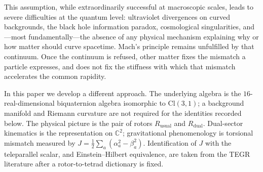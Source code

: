 \documentclass[a4paper]{article}
\begin{document}
This assumption, while extraordinarily successful at macroscopic scales, leads to severe difficulties at the quantum level: ultraviolet divergences on curved backgrounds, the black hole information paradox, cosmological singularities, and---most fundamentally---the absence of any physical mechanism explaining why or how matter should curve spacetime. Mach's principle remains unfulfilled by that continuum. Once the continuum is refused, other matter fixes the mismatch a particle expresses, and does not fix the stiffness with which that mismatch accelerates the common rapidity.

In this paper we develop a different approach. The underlying algebra is the $16$-real-dimensional biquaternion algebra isomorphic to $\mathrm{Cl}(3,1)$; a background manifold and Riemann curvature are not required for the identities recorded below. The physical picture is the pair of rotors $R_\text{usual}$ and $R_\text{dual}$. Dual-sector kinematics is the representation on $\mathbb{C}^2$; gravitational phenomenology is torsional mismatch measured by $J=\frac12\sum_a(\alpha_a^2-\beta_a^2)$. Identification of $J$ with the teleparallel scalar, and Einstein--Hilbert equivalence, are taken from the TEGR literature after a rotor-to-tetrad dictionary is fixed.
\end{document}
